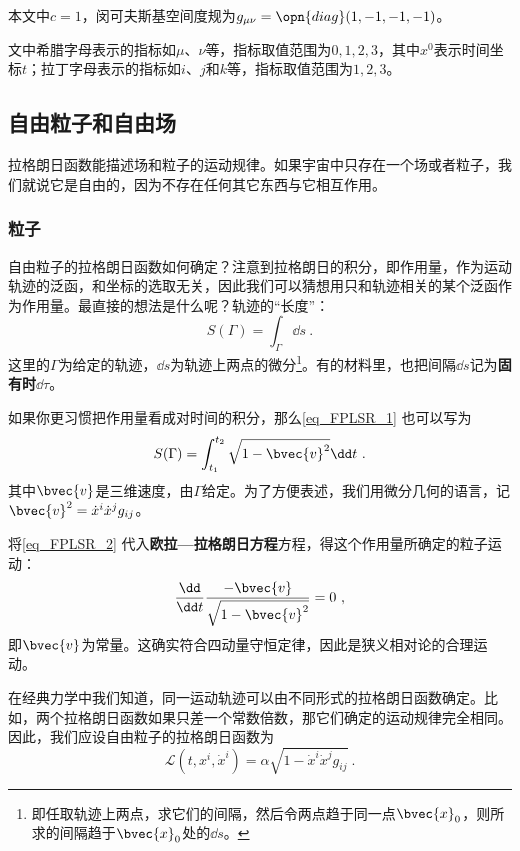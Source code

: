 

本文中$c=1$，闵可夫斯基空间度规为$g_{\mu\nu} = \opn{diag}(1, -1, -1, -1)$。

文中希腊字母表示的指标如$\mu$、$\nu$等，指标取值范围为$0, 1, 2, 3$，其中$x^0$表示时间坐标$t$；拉丁字母表示的指标如$i$、$j$和$k$等，指标取值范围为$1, 2, 3$。

\subsection{自由粒子和自由场}

拉格朗日函数能描述场和粒子的运动规律。如果宇宙中只存在一个场或者粒子，我们就说它是自由的，因为不存在任何其它东西与它相互作用。

\subsubsection{粒子}

自由粒子的拉格朗日函数如何确定？注意到拉格朗日的积分，即作用量，作为运动轨迹的泛函，和坐标的选取无关，因此我们可以猜想用只和轨迹相关的某个泛函作为作用量。最直接的想法是什么呢？轨迹的“长度”：
\begin{equation}\label{eq_FPLSR_1}
S(\Gamma) = \int_\Gamma \dd s~.
\end{equation}
这里的$\Gamma$为给定的轨迹，$\dd s$为轨迹上两点的微分\footnote{即任取轨迹上两点，求它们的间隔，然后令两点趋于同一点$\bvec{x}_0$，则所求的间隔趋于$\bvec{x}_0$处的$\dd s$。}。有的材料里，也把间隔$\dd s$记为\textbf{固有时}$\dd \tau$。

如果你更习惯把作用量看成对时间的积分，那么\autoref{eq_FPLSR_1} 也可以写为
\begin{equation}\label{eq_FPLSR_2}
S(\Gamma) = \int_{t_1}^{t_2} \sqrt{1-\bvec{v}^2} \dd t~.
\end{equation}
其中$\bvec{v}$是三维速度，由$\Gamma$给定。为了方便表述，我们用微分几何的语言，记$\bvec{v}^2=\dot{x}^i\dot{x}^jg_{ij}$。

将\autoref{eq_FPLSR_2} 代入\textbf{欧拉—拉格朗日方程}方程，得这个作用量所确定的粒子运动：
\begin{equation}
\frac{\dd}{\dd t}\frac{-\bvec{v}}{\sqrt{1-\bvec{v}^2}} = 0~,
\end{equation}
即$\bvec{v}$为常量。这确实符合四动量守恒定律，因此是狭义相对论的合理运动。

在经典力学中我们知道，同一运动轨迹可以由不同形式的拉格朗日函数确定。比如，两个拉格朗日函数如果只差一个常数倍数，那它们确定的运动规律完全相同。因此，我们应设自由粒子的拉格朗日函数为
\begin{equation}
\mathcal{L}(t, x^i, \dot{x}^i) = \alpha\sqrt{1-\dot{x}^i\dot{x}^jg_{ij}}~.
\end{equation}

